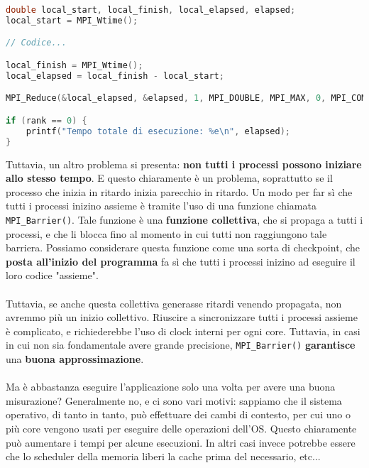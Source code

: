 \begin{codeblock}
    \begin{lstlisting}[language = C, numbers = none, columns=fullflexible]
double local_start, local_finish, local_elapsed, elapsed;
local_start = MPI_Wtime();

// Codice...

local_finish = MPI_Wtime();
local_elapsed = local_finish - local_start;

MPI_Reduce(&local_elapsed, &elapsed, 1, MPI_DOUBLE, MPI_MAX, 0, MPI_COMM_WORLD);

if (rank == 0) {
    printf("Tempo totale di esecuzione: %e\n", elapsed);
}\end{lstlisting}
\end{codeblock}

Tuttavia, un altro problema si presenta: \textbf{non tutti i processi possono iniziare allo stesso tempo}. E questo chiaramente è un problema, soprattutto se il processo che inizia in ritardo inizia parecchio in ritardo. Un modo per far sì che tutti i processi inizino assieme è tramite l'uso di una funzione chiamata \verb|MPI_Barrier()|. Tale funzione è una \textbf{funzione collettiva}, che si propaga a tutti i processi, e che li blocca fino al momento in cui tutti non raggiungono tale barriera. Possiamo considerare questa funzione come una sorta di checkpoint, che \textbf{posta all'inizio del programma} fa sì che tutti i processi inizino ad eseguire il loro codice "assieme".
\\\\
Tuttavia, se anche questa collettiva generasse ritardi venendo propagata, non avremmo più un inizio collettivo. Riuscire a sincronizzare tutti i processi assieme è complicato, e richiederebbe l'uso di clock interni per ogni core. Tuttavia, in casi in cui non sia fondamentale avere grande precisione, \verb|MPI_Barrier()| \textbf{garantisce} una \textbf{buona approssimazione}.
\\\\
Ma è abbastanza eseguire l'applicazione solo una volta per avere una buona misurazione? Generalmente no, e ci sono vari motivi: sappiamo che il sistema operativo, di tanto in tanto, può effettuare dei cambi di contesto, per cui uno o più core vengono usati per eseguire delle operazioni dell'OS. Questo chiaramente può aumentare i tempi per alcune esecuzioni. In altri casi invece potrebbe essere che lo scheduler della memoria liberi la cache prima del necessario, etc...
\\\\
